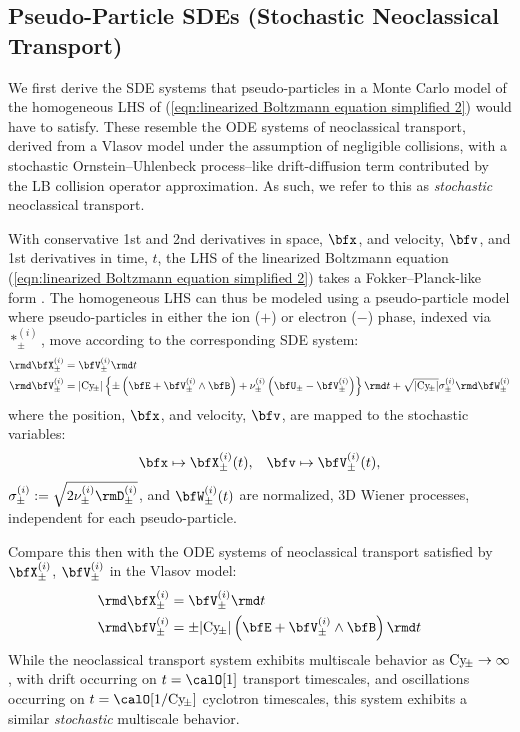 \subsection{Pseudo-Particle SDEs (Stochastic Neoclassical Transport)}
    We first derive the SDE systems that pseudo-particles in a Monte Carlo model of the homogeneous LHS of (\ref{eqn:linearized Boltzmann equation simplified 2}) would have to satisfy. These resemble the ODE systems of neoclassical transport, derived from a Vlasov model under the assumption of negligible collisions, with a stochastic Ornstein--Uhlenbeck process--like drift-diffusion term \cite{Gardiner_1985, Karatzas_Shreve_1991, Gard_1998} contributed by the LB collision operator approximation. As such, we refer to this as \emph{stochastic} neoclassical transport.
    
    With conservative 1st and 2nd derivatives in space, $\bfx$, and velocity, $\bfv$, and 1st derivatives in time, $t$, the LHS of the linearized Boltzmann equation (\ref{eqn:linearized Boltzmann equation simplified 2}) takes a Fokker--Planck-like form \cite{Fokker_1914, Planck_1917}. The homogeneous LHS can thus be modeled using a pseudo-particle model where pseudo-particles in either the ion ($+$) or electron ($-$) phase, indexed via $*_{\pm}^{(i)}$, move according to the corresponding SDE system:
    \begin{align}
        \rmd\bfX_{\pm}^{(i)}  &=  \bfV_{\pm}^{(i)}\rmd t  \label{eqn:stochastic neoclassical transport 1}  \\
        \rmd\bfV_{\pm}^{(i)}  &=  |\rmCy\!_{\pm}|\left\{\pm\left(\bfE + \bfV_{\pm}^{(i)}\wedge\bfB\right) + \nu_{\pm}^{(i)}\left(\bfU_{\pm} - \bfV_{\pm}^{(i)}\right)\right\}\rmd t + \sqrt{|\rmCy\!_{\pm}|}\sigma_{\pm}^{(i)}\rmd\bfW_{\pm}^{(i)}  \label{eqn:stochastic neoclassical transport 2}
    \end{align}
    where the position, $\bfx$, and velocity, $\bfv$, are mapped to the stochastic variables:
    \begin{align}
        \bfx  \mapsto  \bfX_{\pm}^{(i)}(t),  &&
        \bfv  \mapsto  \bfV_{\pm}^{(i)}(t),
    \end{align}
    $\sigma_{\pm}^{(i)}  :=  \sqrt{2\nu_{\pm}^{(i)}\rmD_{\pm}^{(i)}}$, and $\bfW_{\pm}^{(i)}(t)$ are normalized, 3D Wiener processes, independent for each pseudo-particle.

    Compare this then with the ODE systems of neoclassical transport satisfied by $\bfX_{\pm}^{(i)}$, $\bfV_{\pm}^{(i)}$ in the Vlasov model:
    \begin{align}
        \rmd\bfX_{\pm}^{(i)}  &=  \bfV_{\pm}^{(i)}\rmd t  \label{eqn:deterministic neoclassical transport 1}  \\
        \rmd\bfV_{\pm}^{(i)}  &=  \pm|\rmCy\!_{\pm}|\left(\bfE + \bfV_{\pm}^{(i)}\wedge\bfB\right)\rmd t  \label{eqn:deterministic neoclassical transport 2}
    \end{align}
    While the neoclassical transport system exhibits multiscale behavior as $\mathrm{Cy}\!_{\pm} \rightarrow \infty$, with drift occurring on $t = \calO[1]$ transport timescales, and oscillations occurring on $t = \calO[1/\rmCy\!_{\pm}]$ cyclotron timescales, this system exhibits a similar \emph{stochastic} multiscale behavior.

